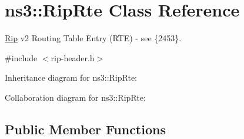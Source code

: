 \hypertarget{classns3_1_1RipRte}{}\section{ns3\+:\+:Rip\+Rte Class Reference}
\label{classns3_1_1RipRte}


\hyperlink{classns3_1_1Rip}{Rip} v2 Routing Table Entry (R\+TE) -\/ see \{2453\}.  




{\ttfamily \#include $<$rip-\/header.\+h$>$}



Inheritance diagram for ns3\+:\+:Rip\+Rte\+:


Collaboration diagram for ns3\+:\+:Rip\+Rte\+:
\subsection*{Public Member Functions}
